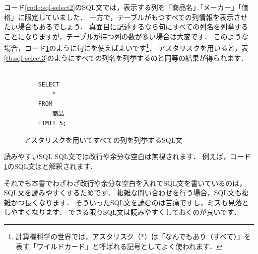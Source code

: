 コード\ref{code:sql-select2}のSQL文では，表示する列を「商品名」「メーカー」「価格」に限定していました．
一方で，テーブルがもつすべての列情報を表示させたい場合もあるでしょう．
真面目に記述するなら句にすべての列名を列挙することになりますが，テーブルが持つ列の数が多い場合は大変です．
このような場合，コード\ref{code:sql-select3}のように句にを使えばよいです\footnote{計算機科学の世界では，アスタリスク（*）は「なんでもあり（すべて）」を表す「ワイルドカード」と呼ばれる記号としてよく使われます．}．
アスタリスクを用いると，表\ref{tb:sql-select3}のようにすべての列名を列挙するのと同等の結果が得られます．
\begin{figure}[!htbp]
    \begin{verbatim}

    SELECT
        *
    FROM
        商品
    LIMIT 5;

    \end{verbatim}
    \captionsetup{name=コード}
    \caption{アスタリスクを用いてすべての列を列挙するSQL文}
    \label{code:sql-select3}
\end{figure}

\begin{table}[!htbp]
    \centering
    \caption{テーブル「商品」に対する射影の結果（すべての列について，先頭の5件のレコードを表示）}
    \label{tb:sql-select3}
\end{table}


\begin{tipbox}{読みやすいSQL}
SQL文では改行や余分な空白は無視されます．
例えば，コード\ref{code:sql-select3}のSQL文はと解釈されます．

それでも本書でわざわざ改行や余分な空白を入れてSQL文を書いているのは，SQL文を読みやすくするためです．
複雑な問い合わせを行う場合，SQL文も複雑かつ長くなります．
そういったSQL文を読むのは苦痛ですし，ミスも見落としやすくなります．
できる限りSQL文は読みやすくしておくのが良いです．
\end{tipbox}


